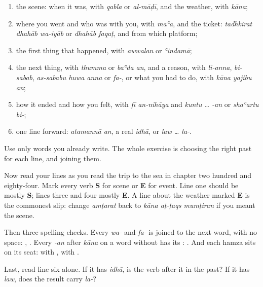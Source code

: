 \begin{enumerate}
\raggedright
  \item the scene: when it was, with \emph{qabla} or \emph{al-māḍī}, and the weather, with \emph{kāna};
  \item where you went and who was with you, with \emph{maʿa}, and the ticket: \emph{tadhkirat dhahāb wa-iyāb} or \emph{dhahāb faqaṭ}, and from which platform;
  \item the first thing that happened, with \emph{awwalan} or \emph{ʿindamā};
  \item the next thing, with \emph{thumma} or \emph{baʿda an}, and a reason, with \emph{li-anna}, \emph{bi-sabab}, \emph{as-sababu huwa anna} or \emph{fa-}, or what you had to do, with \emph{kāna yajibu an};
  \item how it ended and how you felt, with \emph{fī an-nihāya} and \emph{kuntu … -an} or \emph{shaʿartu bi-};
  \item one line forward: \emph{atamannā an}, a real \emph{idhā}, or \emph{law … la-}.
\end{enumerate}

Use only words you already write. The whole exercise is choosing the right past for each line, and joining them.

\begin{tcolorbox}[breakable,colback=teal!4,colframe=teal!35!black,title={Before you move on}]
Now read your lines as you read the trip to the sea in chapter two hundred and eighty-four. Mark every verb \textbf{S} for scene or \textbf{E} for event. Line one should be mostly \textbf{S}; lines three and four mostly \textbf{E}. A line about the weather marked \textbf{E} is the commonest slip: change \emph{amṭarat} back to \emph{kāna aṭ-ṭaqs mumṭiran} if you meant the scene.

Then three spelling checks. Every \emph{wa-} and \emph{fa-} is joined to the next word, with no space: \textbf{}, \textbf{}. Every \emph{-an} after \emph{kāna} on a word without \textbf{} has its \textbf{}: \textbf{}. And each hamza sits on its seat: \textbf{} with \textbf{}, \textbf{} with \textbf{}.

Last, read line six alone. If it has \emph{idhā}, is the verb after it in the past? If it has \emph{law}, does the result carry \emph{la-}?
\end{tcolorbox}
